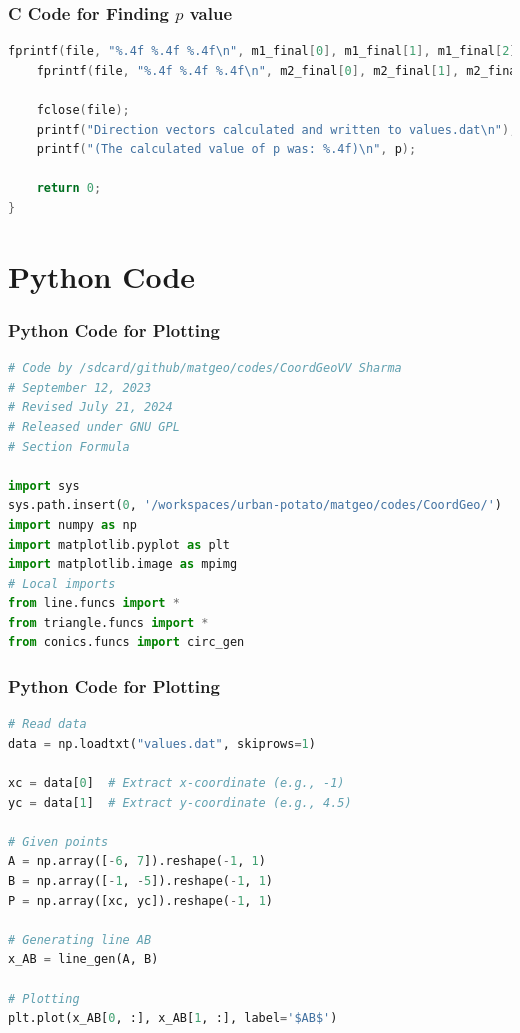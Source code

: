 \documentclass{beamer}
\theoremstyle{remark}
\numberwithin{equation}{section}
\begin{document}
\begin{frame}[fragile]
\frametitle{C Code for Finding $p$ value}
\begin{lstlisting}[language=C]
    fprintf(file, "%.4f %.4f %.4f\n", m1_final[0], m1_final[1], m1_final[2]);
    fprintf(file, "%.4f %.4f %.4f\n", m2_final[0], m2_final[1], m2_final[2]);

    fclose(file);
    printf("Direction vectors calculated and written to values.dat\n");
    printf("(The calculated value of p was: %.4f)\n", p);

    return 0;
}
\end{lstlisting}
\end{frame}

\section{Python Code}
\begin{frame}[fragile]
\frametitle{Python Code for Plotting}
\begin{lstlisting}[language=Python]
# Code by /sdcard/github/matgeo/codes/CoordGeoVV Sharma
# September 12, 2023
# Revised July 21, 2024
# Released under GNU GPL
# Section Formula

import sys
sys.path.insert(0, '/workspaces/urban-potato/matgeo/codes/CoordGeo/')  # path to my scripts
import numpy as np
import matplotlib.pyplot as plt
import matplotlib.image as mpimg
# Local imports
from line.funcs import *
from triangle.funcs import *
from conics.funcs import circ_gen

\end{lstlisting}
\end{frame}

\begin{frame}[fragile]
\frametitle{Python Code for Plotting}
\begin{lstlisting}[language=Python]
# Read data
data = np.loadtxt("values.dat", skiprows=1)

xc = data[0]  # Extract x-coordinate (e.g., -1)
yc = data[1]  # Extract y-coordinate (e.g., 4.5)

# Given points
A = np.array([-6, 7]).reshape(-1, 1)
B = np.array([-1, -5]).reshape(-1, 1)
P = np.array([xc, yc]).reshape(-1, 1)

# Generating line AB
x_AB = line_gen(A, B)

# Plotting
plt.plot(x_AB[0, :], x_AB[1, :], label='$AB$')

\end{lstlisting}
\end{frame}
\end{document}
